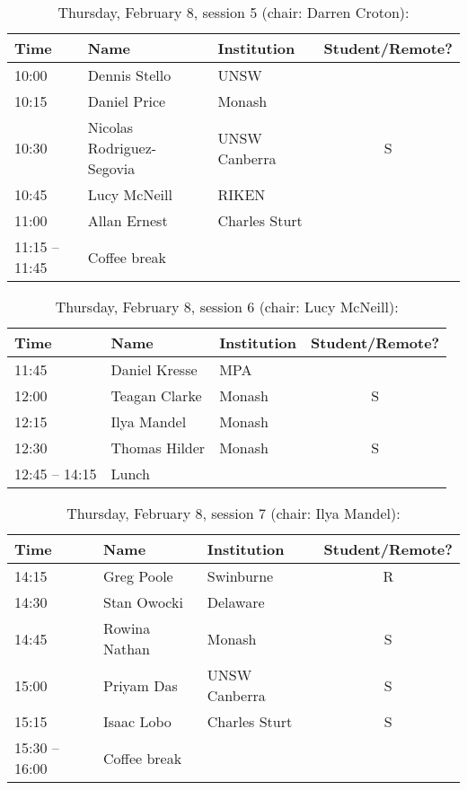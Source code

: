 \documentclass[amsmath,onecolumn]{revtex4-1}
\begin{document}
\begin{table}[!htbp]
	\centering
	\caption{Thursday, February 8, session 5 (chair: Darren Croton):}
\begin{tabular}{| l | l | l | c |}
	\hline
	Time & Name  & Institution & Student/Remote?\\ 		
	\hline
	10:00 & Dennis	Stello & UNSW & \\
	10:15 & Daniel Price & Monash & \\
	10:30 & Nicolas 	Rodriguez-Segovia  & UNSW Canberra & S\\
	10:45 & Lucy	McNeill & RIKEN & \\
	11:00 & 	Allan	Ernest  & Charles Sturt &  \\
	\hline
	11:15 -- 11:45 & Coffee break & & \\
	\hline
\end{tabular}
\end{table}

\begin{table}[!htbp]
	\centering
	\caption{Thursday, February 8, session 6 (chair:  Lucy	McNeill):}
\begin{tabular}{| l | l | l | c |}
	\hline
	Time & Name  & Institution & Student/Remote? \\ 		
	\hline
	11:45 & Daniel	Kresse & MPA & \\
	12:00 & Teagan	 Clarke & Monash & S\\
	12:15 & Ilya	Mandel & Monash & \\	
	12:30 & Thomas	Hilder & Monash & S\\
	\hline
	12:45 -- 14:15 & Lunch & & \\
	\hline
\end{tabular}
\end{table}

\begin{table}[!htbp]
	\centering
	\caption{Thursday, February 8, session 7 (chair: Ilya Mandel):}
\begin{tabular}{| l | l | l | c |}
	\hline
	Time & Name  & Institution & Student/Remote? \\ 		
	\hline
	14:15& Greg Poole & Swinburne & R \\
	14:30 & Stan	Owocki & Delaware & \\
	14:45 & Rowina	Nathan & Monash & S\\
	15:00 & Priyam	Das  & UNSW Canberra & S \\	
	15:15 &  Isaac	Lobo&  Charles Sturt & S \\
	\hline
	15:30 -- 16:00 & Coffee break & & \\
	\hline
\end{tabular}
\end{table}
	
\end{document}
